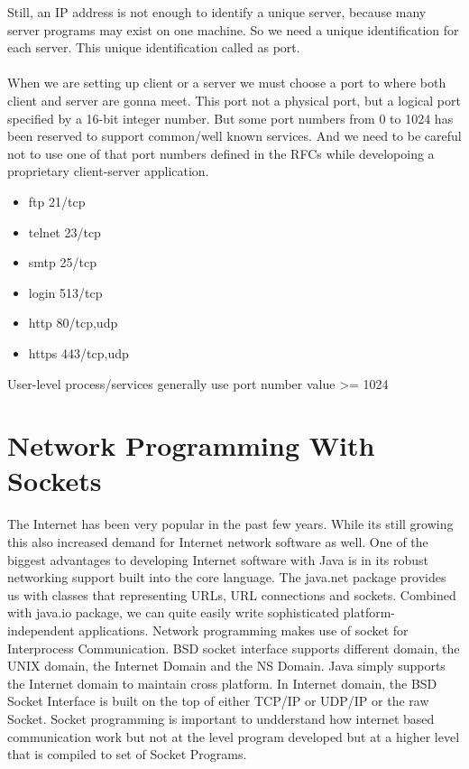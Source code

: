 \documentclass[12pt]{extarticle}
\begin{document}
 Still, an IP address is not enough to identify a unique server, because many server programs may
 exist on one machine. So we need a unique identification for each server. This unique identification
 called as port. \\ \\

 When we are setting up client or a server we must choose a port to where both client and server are
gonna meet. This port not a physical port, but a logical port specified by a 16-bit integer number.
But some port numbers from 0 to 1024 has been reserved to support common/well known services.
And we need to be careful not to use one of that port numbers defined in the RFCs while developoing a
proprietary client-server application.

\begin{itemize}

    \item ftp 21/tcp
    \item telnet 23/tcp
    \item smtp 25/tcp
    \item login 513/tcp
    \item http 80/tcp,udp
    \item https 443/tcp,udp
    
\end{itemize}

User-level process/services generally use port number value >= 1024

\section{Network Programming With Sockets}

The Internet has been very popular in the past few years. While its still growing this also 
increased demand for Internet network software as well. One of the biggest advantages to developing
Internet software with Java is in its robust networking support built into the core language.
The java.net package provides us with classes that representing URLs, URL connections and sockets.
Combined with java.io package, we can quite easily write sophisticated platform-independent applications.
Network programming makes use of socket for Interprocess Communication. BSD socket interface supports
different domain, the UNIX domain, the Internet Domain and the NS Domain. Java simply supports the
Internet domain to maintain cross platform. In Internet domain, the BSD Socket Interface is built
on the top of either TCP/IP or UDP/IP or the raw Socket. Socket programming is important to undderstand
how internet based communication work but not at the level program developed but at a higher
level that is compiled to set of Socket Programs.
\end{document}
